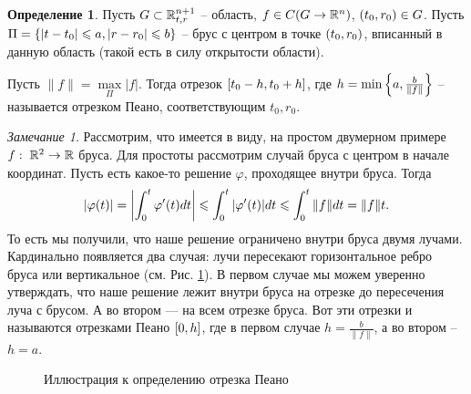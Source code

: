\documentclass[a5paper, 10pt]{article}
\theoremstyle{definition}
\newtheorem{Def}{Определение}
\theoremstyle{plain}
\theoremstyle{remark}
\newtheorem*{Note}{Замечание}
\begin{document}
 	\begin{Def}
 		Пусть $G \subset \mathbb{R}^{n+1}_{t,r}$ -- область, $f \in C(G \rightarrow \mathbb{R}^n)$, $\left(t_0, r_0\right) \in G$. Пусть $\Pi= \left\{|t-t_0|\leqslant a, |r-r_0| \leqslant b\right\}$ -- брус с центром в точке  $\left(t_0, r_0\right)$, вписанный в данную область (такой есть в силу открытости области).
 		
 		Пусть $\|f\| = \max\limits_{\Pi} |f|$. Тогда отрезок $\left[t_0-h, t_0+h\right]$, где $h=\min \left\{a, \frac{b}{\|f\|}\right\}$ -- называется отрезком Пеано, соответствующим $t_0, r_0$.
 	\end{Def}
 	\begin{Note}
 		Рассмотрим, что имеется в виду, на простом двумерном примере $f:\; \mathbb{R}^2 \rightarrow \mathbb{R}$ бруса. Для простоты рассмотрим случай бруса с центром в начале координат.
 		Пусть есть какое-то решение $\varphi$, проходящее внутри бруса. Тогда 
 		\[
 		\left|\varphi(t)\right| = \left|\int_0^t \varphi'(t) dt\right| \leqslant \int_0^t |\varphi'(t)| dt \leqslant \int_0^t \|f\| dt = \|f\| t.
 		\]
 		То есть мы получили, что наше решение ограничено внутри бруса двумя лучами. Кардинально появляется два случая: лучи пересекают горизонтальное ребро бруса или вертикальное (см. Рис. \ref{Peano}). В первом случае мы можем уверенно утверждать, что наше решение лежит внутри бруса на отрезке до пересечения луча с брусом. А во втором --- на всем отрезке бруса. Вот эти отрезки и называются отрезками Пеано $\left[0, h\right]$, где в первом случае $h=\frac{b}{\|f\|}$, а во втором -- $h=a$.
 		\begin{figure}
 			\centering
 			\begin{subfigure}{0.45\linewidth}
 			\end{subfigure}
 			\begin{subfigure}{0.45\linewidth}
 		\end{subfigure}
 		\caption{Иллюстрация к определению отрезка Пеано} \label{Peano}
 		\end{figure}
 	\end{Note}
 
\end{document}
